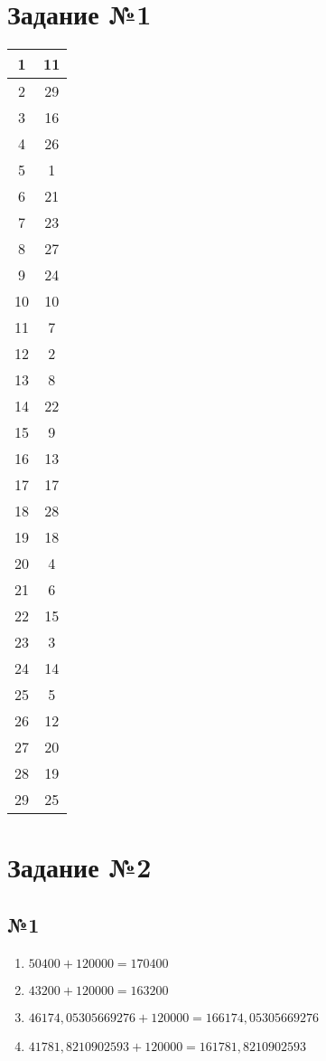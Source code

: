 \documentclass[a4paper, 12pt]{article}
\begin{document}
	\section{Задание №1}
	\begin{center}
		\begin{tabular}{ | c | c | }
			\hline
			1 & 11 \\
			\hline
			2 & 29 \\
			\hline
			3 & 16 \\
			\hline
			4 & 26 \\
			\hline
			5 & 1 \\
			\hline
			6 & 21 \\
			\hline
			7 & 23 \\
			\hline
			8 & 27 \\
			\hline
			9 & 24 \\
			\hline
			10 & 10 \\
			\hline
			11 & 7 \\
			\hline
			12 & 2 \\
			\hline
			13 & 8 \\
			\hline
			14 & 22 \\
			\hline
			15 & 9 \\
			\hline
			16 & 13 \\
			\hline
			17 & 17 \\
			\hline
			18 & 28 \\
			\hline
			19 & 18 \\
			\hline
			20 & 4 \\
			\hline
			21 & 6 \\
			\hline
			22 & 15 \\
			\hline
			23 & 3 \\
			\hline
			24 & 14 \\
			\hline
			25 & 5 \\
			\hline
			26 & 12 \\
			\hline
			27 & 20 \\
			\hline
			28 & 19 \\
			\hline
			29 & 25 \\
			\hline
		\end{tabular}
	\end{center}

	\section{Задание №2}
	
	\subsection{№1}
	\begin{enumerate}
		\item $50 400 + 120 000 = 170 400$
		\item $43 200 + 120 000 = 163 200$
		\item $46 174,05305669276 + 120 000 = 166 174,05305669276$
		\item $41 781,8210902593 + 120 000 = 161 781,8210902593$
	\end{enumerate}
\end{document}
